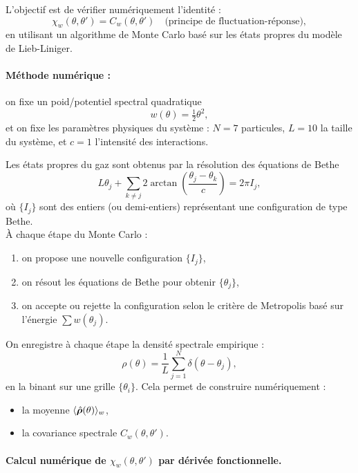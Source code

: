 L'objectif est de vérifier numériquement l'identité :
\[
\chi_w(\theta, \theta') = C_w(\theta, \theta') \quad \text{(principe de fluctuation-réponse)},
\]
en utilisant un algorithme de Monte Carlo basé sur les états propres du modèle de Lieb-Liniger.

\paragraph{Méthode numérique :} on fixe un poid/potentiel spectral quadratique
\[
w(\theta) = \tfrac{1}{2} \theta^2,
\]
et on fixe les paramètres physiques du système : \( N = 7 \) particules, \( L = 10 \) la taille du système, et \( c = 1 \) l’intensité des interactions.

Les états propres du gaz sont obtenus par la résolution des équations de Bethe
\[
L \theta_j + \sum_{k \ne j} 2 \arctan \left( \frac{\theta_j - \theta_k}{c} \right) = 2 \pi I_j,
\]
où \( \{I_j\} \) sont des entiers (ou demi-entiers) représentant une configuration de type Bethe.\\

À chaque étape du Monte Carlo :
\begin{enumerate}
    \item on propose une nouvelle configuration \( \{I_j\} \),
    \item on résout les équations de Bethe pour obtenir \( \{ \theta_j \} \),
    \item on accepte ou rejette la configuration selon le critère de Metropolis basé sur l’énergie \( \sum w(\theta_j) \).
\end{enumerate}

On enregistre à chaque étape la densité spectrale empirique :
\[
\rho(\theta) = \frac{1}{L} \sum_{j=1}^N \delta(\theta - \theta_j),
\]
en la binant sur une grille \( \{ \theta_i \} \). Cela permet de construire numériquement :
\begin{itemize}
    \item la moyenne \( \langle \hat{\bm{\rho}}(\theta) \rangle_w \),
    \item la covariance spectrale \( C_w(\theta, \theta') \).
\end{itemize}

\paragraph{Calcul numérique de \( \chi_w(\theta, \theta') \) par dérivée fonctionnelle.}

